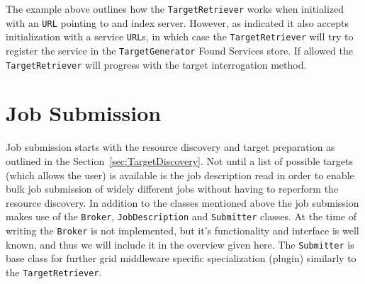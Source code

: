 \documentclass{book}
\newcommand{\TargetGenerator}{\texttt{TargetGenerator}}
\newcommand{\TargetRetriever}{\texttt{TargetRetriever}}
\newcommand{\Broker}{\texttt{Broker}}
\newcommand{\Submitter}{\texttt{Submitter}}
\newcommand{\JobDescription}{\texttt{JobDescription}}
\newcommand{\URL}{\texttt{URL}}
\begin{document}
The example above outlines how the {\TargetRetriever} works when initialized with an {\URL} pointing to and index server. However, 
as indicated it also accepts initialization with a service {\URL}s, in which case the {\TargetRetriever} will try to register the 
service in the {\TargetGenerator} Found Services store. If allowed the {\TargetRetriever} will progress with the target interrogation 
method.

\section{Job Submission}
\label{sec:JobSubmission}
Job submission starts with the resource discovery and target preparation as outlined in the Section~\ref{sec:TargetDiscovery}. 
Not until a list of possible targets (which allows the user) is available is the job description read in order to enable bulk 
job submission of widely different jobs without having to reperform the resource discovery. In addition to the classes mentioned 
above the job submission makes use of the {\Broker}, {\JobDescription} and {\Submitter} classes. At the time of writing the {\Broker} is 
not implemented, but it's functionality and interface is well known, and thus we will include it in the overview given here.
The {\Submitter} is base class for further grid middleware specific specialization (plugin) similarly to the {\TargetRetriever}.

\begin{figure}[ht]
\end{figure}
\end{document}
